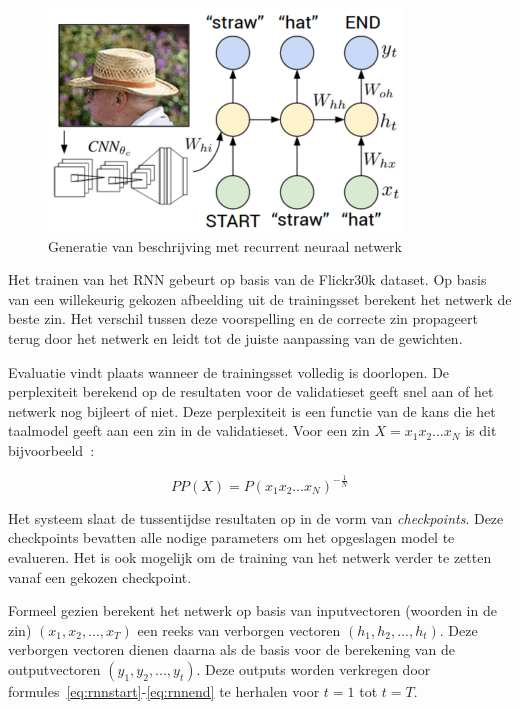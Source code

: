 \begin{figure}[tb]
    \centering
    \includegraphics[width=0.5\linewidth]{Images/karpathy.PNG}
    \caption[Generatie van beschrijving met recurrent neuraal netwerk]{Generatie van beschrijving met recurrent neuraal netwerk~\cite{Karpathy2015}}
\label{fig:rnntraining}
\end{figure}

Het trainen van het RNN gebeurt op basis van de Flickr30k dataset. 
Op basis van een willekeurig gekozen afbeelding uit de trainingsset berekent het netwerk de beste zin. Het verschil tussen deze voorspelling en de correcte zin propageert terug door het netwerk en leidt tot de juiste aanpassing van de gewichten.

Evaluatie vindt plaats wanneer de trainingsset volledig is doorlopen. De perplexiteit berekend op de resultaten voor de validatieset geeft snel aan of het netwerk nog bijleert of niet. Deze perplexiteit is een functie van de kans die het taalmodel geeft aan een zin in de validatieset. Voor een zin $X=x_1x_2\dots x_N$ is dit bijvoorbeeld~\cite{Jurafsky:2009:SLP:1214993}:

\begin{equation}
PP(X)=P(x_1x_2\dots x_N)^{-\frac{1}{N}}
\end{equation}

Het systeem slaat de tussentijdse resultaten op in de vorm van \emph{checkpoints}. Deze checkpoints bevatten alle nodige parameters om het opgeslagen model te evalueren. Het is ook mogelijk om de training van het netwerk verder te zetten vanaf een gekozen checkpoint.

Formeel gezien berekent het netwerk op basis van inputvectoren (woorden in de zin) $(x_1,x_2,...,x_T)$ een reeks van verborgen vectoren $(h_1,h_2,...,h_t)$. Deze verborgen vectoren dienen daarna als de basis voor de berekening van de outputvectoren $(y_1,y_2,...,y_t)$. Deze outputs worden verkregen door formules~\eqref{eq:rnnstart}-\eqref{eq:rnnend} te herhalen voor $t = 1$ tot $t=T$.


